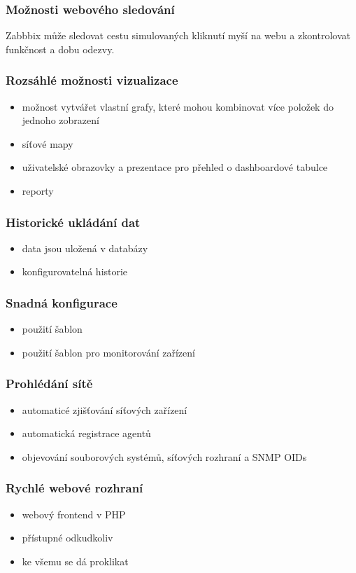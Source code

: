 \documentclass{article}
\begin{document}
\subsubsection{Možnosti webového sledování}
Zabbbix může sledovat cestu simulovaných kliknutí myší na webu a zkontrolovat funkčnost a dobu odezvy.
\subsubsection{Rozsáhlé možnosti vizualizace}
\begin{itemize}
    \item možnost vytvářet vlastní grafy, které mohou kombinovat více položek do jednoho zobrazení
    \item síťové mapy
    \item uživatelské obrazovky a prezentace pro přehled o dashboardové tabulce
    \item reporty
\end{itemize}
\subsubsection{Historické ukládání dat}
\begin{itemize}
    \item data jsou uložená v databázy
    \item konfigurovatelná historie
\end{itemize}
\subsubsection{Snadná konfigurace}
\begin{itemize}
    \item použití šablon
    \item použití šablon pro monitorování zařízení
\end{itemize}
\subsubsection{Prohlédání sítě}
\begin{itemize}
    \item automaticé zjišťování síťových zařízení
    \item automatická registrace agentů
    \item objevování souborových systémů, síťových rozhraní a SNMP OIDs
\end{itemize}
\subsubsection{Rychlé webové rozhraní}
\begin{itemize}
    \item webový frontend v PHP
    \item přístupné odkudkoliv
    \item ke všemu se dá proklikat
\end{itemize}
\end{document}

